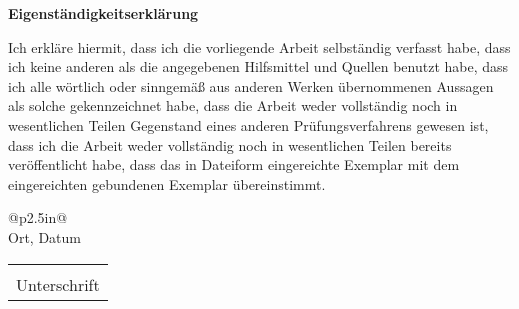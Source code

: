 \documentclass[a4paper, 12pt]{proc}
\begin{document}
\begin{center}
    \textbf{Eigenständigkeitserklärung}
\end{center}
Ich erkläre hiermit, dass ich die vorliegende Arbeit selbständig verfasst habe,
dass ich keine anderen als die angegebenen Hilfsmittel und Quellen benutzt
habe, dass ich alle wörtlich oder sinngemäß aus anderen Werken übernommenen
Aussagen als solche gekennzeichnet habe, dass die Arbeit weder vollständig noch
in wesentlichen Teilen Gegenstand eines anderen Prüfungsverfahrens gewesen ist,
dass ich die Arbeit weder vollständig noch in wesentlichen Teilen bereits
veröffentlicht habe, dass das in Dateiform eingereichte Exemplar mit dem
eingereichten gebundenen Exemplar übereinstimmt.

\vspace{25mm}
\begin{minipage}{0.5\linewidth}
    \centering
        \begin{tabular}{@{}p{2.5in}@{}}
            \hrulefill \\
            Ort, Datum\\
        \end{tabular}
\end{minipage}
\vspace{25mm}
\begin{minipage}{0.5\linewidth}
    \centering
        \begin{tabular}{@{}p{2.5in}@{}}
            \hrulefill \\
            Unterschrift\\
        \end{tabular}
\end{minipage}
\end{document}
